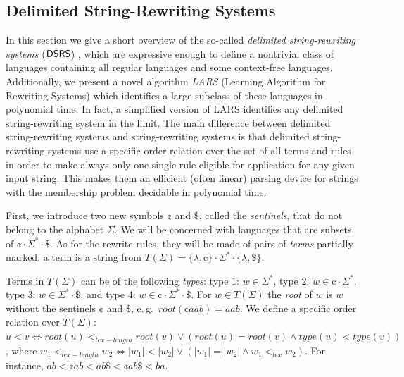 \subsection{Delimited String-Rewriting Systems}
\label{section:delimited-string-rewriting-systems}

In this section we give a short overview of the so-called \emph{delimited string-rewriting systems} (\index{$\DSRS$}$\DSRS$) \cite{Eyraud2007}, which are expressive enough to define a nontrivial class of languages containing all regular languages and some context-free languages. Additionally, we present a novel algorithm \emph{LARS} \cite{Eyraud2007} (Learning Algorithm for Rewriting Systems) which identifies a large subclass of these languages in polynomial time. In fact, a simplified version of LARS \cite{delaHiguera2010} identifies any delimited string-rewriting system in the limit. The main difference between delimited string-rewriting systems and string-rewriting systems is that delimited string-rewriting systems use a specific order relation over the set of all terms and rules in order to make always only one single rule eligible for application for any given input string. This makes them an efficient (often linear) parsing device for strings with the membership problem decidable in polynomial time.

First, we introduce two new symbols \index{$\cent$}$\cent$ and \index{$\$$}$\$$, called the \emph{sentinels}, that do not belong to the alphabet $\Sigma$. We will be concerned with languages that are subsets of $\cent \cdot \Sigma^* \cdot \$$. As for the rewrite rules, they will be made of pairs of \emph{terms} partially marked; a term is a string from $T(\Sigma) = \{\lambda, \cent\} \cdot \Sigma^* \cdot \{\lambda, \$\}$.

Terms in $T(\Sigma)$ can be of the following \emph{types}: type $1$: $w \in \Sigma^*$, type $2$: $w \in \cent \cdot \Sigma^*$, type $3$: $w \in \Sigma^* \cdot \$$, and type $4$: $w \in \cent \cdot \Sigma^* \cdot \$$. For $w \in T(\Sigma)$ the \emph{root} of $w$ is $w$ without the sentinels $\cent$ and $\$$, e.\,g.\ $root(\cent aab) = aab$. We define a specific order relation over $T(\Sigma)$: $u < v \Leftrightarrow root(u) <_{lex-length} root(v) \vee (root(u) = root(v) \wedge type(u) < type(v))$, where $w_1 <_{lex-length} w_2 \Leftrightarrow |w_1| < |w_2| \vee (|w_1| = |w_2| \wedge w_1 <_{lex} w_2)$. For instance, $ab < \cent ab < ab \$ < \cent ab \$ < ba$.

